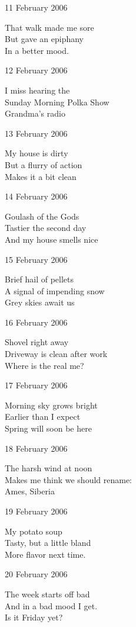 \documentclass[12pt]{article}
\begin{document}
11 February 2006

That walk made me sore \\
But gave an epiphany \\
In a better mood.

12 February 2006

I miss hearing the \\
Sunday Morning Polka Show \\
Grandma's radio


\newpage

13 February 2006

My house is dirty \\
But a flurry of action \\
Makes it a bit clean

14 February 2006

Goulash of the Gods \\
Tastier the second day \\
And my house smells nice

15 February 2006

Brief hail of pellets \\
A signal of impending snow \\
Grey skies await us

16 February 2006

Shovel right away \\
Driveway is clean after work \\
Where is the real me?

17 February 2006

Morning sky grows bright \\
Earlier than I expect \\
Spring will soon be here

18 February 2006

The harsh wind at noon \\
Makes me think we should rename: \\
Ames, Siberia


\newpage

19 February 2006

My potato soup \\
Tasty, but a little bland \\
More flavor next time.

20 February 2006

The week starts off bad \\
And in a bad mood I get. \\
Is it Friday yet?
\end{document}
